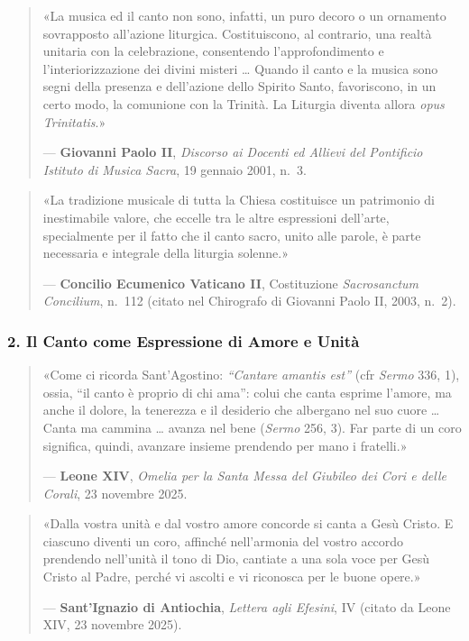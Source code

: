 \documentclass[12pt,a4paper]{article}
\begin{document}
	\begin{quote}
		«La musica ed il canto non sono, infatti, un puro decoro o un ornamento sovrapposto all'azione liturgica. Costituiscono, al contrario, una realtà unitaria con la celebrazione, consentendo l'approfondimento e l'interiorizzazione dei divini misteri \ldots{} Quando il canto e la musica sono segni della presenza e dell'azione dello Spirito Santo, favoriscono, in un certo modo, la comunione con la Trinità. La Liturgia diventa allora \emph{opus Trinitatis}.»
		
		--- \textbf{Giovanni Paolo II}, \emph{Discorso ai Docenti ed Allievi del Pontificio Istituto di Musica Sacra}, 19 gennaio 2001, n.~3.
	\end{quote}
	
	\begin{quote}
		«La tradizione musicale di tutta la Chiesa costituisce un patrimonio di inestimabile valore, che eccelle tra le altre espressioni dell'arte, specialmente per il fatto che il canto sacro, unito alle parole, è parte necessaria e integrale della liturgia solenne.»
		
		--- \textbf{Concilio Ecumenico Vaticano II}, Costituzione \emph{Sacrosanctum Concilium}, n.~112 (citato nel Chirografo di Giovanni Paolo II, 2003, n.~2).
	\end{quote}
	
	\subsubsection{2. Il Canto come Espressione di Amore e Unità}\label{il-canto-come-espressione-di-amore-e-unita}
	
	\begin{quote}
		«Come ci ricorda Sant'Agostino: \emph{``Cantare amantis est''} (cfr \emph{Sermo} 336, 1), ossia, ``il canto è proprio di chi ama'': colui che canta esprime l'amore, ma anche il dolore, la tenerezza e il desiderio che albergano nel suo cuore \ldots{} Canta ma cammina \ldots{} avanza nel bene (\emph{Sermo} 256, 3). Far parte di un coro significa, quindi, avanzare insieme prendendo per mano i fratelli.»
		
		--- \textbf{Leone XIV}, \emph{Omelia per la Santa Messa del Giubileo dei Cori e delle Corali}, 23 novembre 2025.
	\end{quote}
	
	\begin{quote}
		«Dalla vostra unità e dal vostro amore concorde si canta a Gesù Cristo. E ciascuno diventi un coro, affinché nell'armonia del vostro accordo prendendo nell'unità il tono di Dio, cantiate a una sola voce per Gesù Cristo al Padre, perché vi ascolti e vi riconosca per le buone opere.»
		
		--- \textbf{Sant'Ignazio di Antiochia}, \emph{Lettera agli Efesini}, IV (citato da Leone XIV, 23 novembre 2025).
	\end{quote}
	
\end{document}
